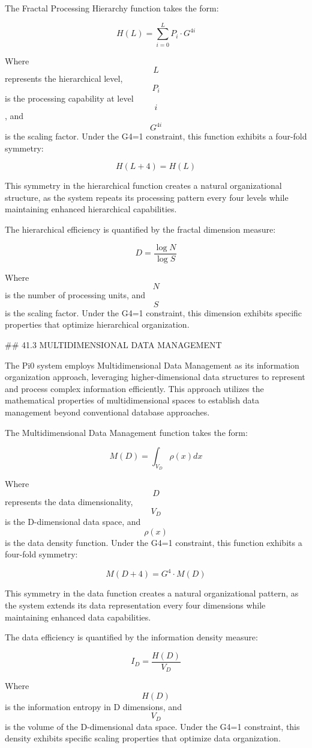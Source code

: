 The Fractal Processing Hierarchy function takes the form:

$$ H(L) = \sum_{i=0}^{L} P_i \cdot G^{4i} $$

Where $$ L $$ represents the hierarchical level, $$ P_i $$ is the processing capability at level $$ i $$, and $$ G^{4i} $$ is the scaling factor. Under the G4=1 constraint, this function exhibits a four-fold symmetry:

$$ H(L+4) = H(L) $$

This symmetry in the hierarchical function creates a natural organizational structure, as the system repeats its processing pattern every four levels while maintaining enhanced hierarchical capabilities.

The hierarchical efficiency is quantified by the fractal dimension measure:

$$ D = \frac{\log N}{\log S} $$

Where $$ N $$ is the number of processing units, and $$ S $$ is the scaling factor. Under the G4=1 constraint, this dimension exhibits specific properties that optimize hierarchical organization.

## 41.3 MULTIDIMENSIONAL DATA MANAGEMENT

The Pi0 system employs Multidimensional Data Management as its information organization approach, leveraging higher-dimensional data structures to represent and process complex information efficiently. This approach utilizes the mathematical properties of multidimensional spaces to establish data management beyond conventional database approaches.

The Multidimensional Data Management function takes the form:

$$ M(D) = \int_{V_D} \rho(x) dx $$

Where $$ D $$ represents the data dimensionality, $$ V_D $$ is the D-dimensional data space, and $$ \rho(x) $$ is the data density function. Under the G4=1 constraint, this function exhibits a four-fold symmetry:

$$ M(D+4) = G^4 \cdot M(D) $$

This symmetry in the data function creates a natural organizational pattern, as the system extends its data representation every four dimensions while maintaining enhanced data capabilities.

The data efficiency is quantified by the information density measure:

$$ I_D = \frac{H(D)}{V_D} $$

Where $$ H(D) $$ is the information entropy in D dimensions, and $$ V_D $$ is the volume of the D-dimensional data space. Under the G4=1 constraint, this density exhibits specific scaling properties that optimize data organization.

